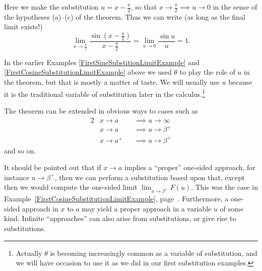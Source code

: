 Here we make the substitution $u=x-\frac{\pi}2$, so that
$x\to\frac{\pi}2\implies u\to0$ in the sense of the hypotheses
(a)--(c) of the theorem.  Thus we can write (as long as the final 
limit exists!)
$$\lim_{x\to\frac{\pi}2}\frac{\sin\left(x-\frac{\pi}2\right)}
        {x-\frac{\pi}2}=\lim_{u\to0}\frac{\sin u}u=1.$$
\eex

In the earlier Examples \ref{FirstSineSubstitionLimitExample}
and \ref{FirstCosineSubstitutionLimitExample}
 above we used $\theta$ to play the role of $u$
in the theorem, but that is mostly a matter of taste.  We will usually use
$u$ because it is the traditional variable of substitution
later in the calculus.\footnote{%
Actually $\theta$ is becoming increasingly common as a variable
of substitution, and we will have occasion
to use it as we did in our first substitution examples.
} 



The theorem can be extended in obvious ways to cases
such as
\begin{alignat*}{2}
&x\to a&&\implies u\to\infty\\
&x\to a&&\implies u\to\beta^+\\
&x\to a^+&&\implies u\to\beta^+
\end{alignat*}
and so on.%



It should be pointed out that if $x\to a$ implies a 
``proper'' one-sided approach, for instance $u\to\beta^+$,
then we can perform a substitution based upon that,
except then we would compute the one-sided
limit $\lim_{u\to\beta^+}F(u)$. This was the case
in Example~\ref{FirstCosineSubstitutionLimitExample},
page~\pageref{FirstCosineSubstitutionLimitExample}. Furthermore, 
a one-sided approach in $x$ to $a$ may yield a 
proper approach in a variable $u$ of some kind.
Infinite ``approaches'' can also arise from substitutions,
or give rise to substitutions.



